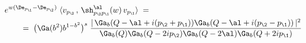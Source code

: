 \begin{equation}\label{g-matel}
\begin{aligned}
{} & e^{w(\De_{p_\1}-\De_{p_\2})}\;
\langle  v_{p_\2}\, ,\, \sh_{p_\2p_\1}^{\al}(w)\,
v_{p_\1} \rangle\;=\;\\
& \qquad =\;  \big(\Ga(b^2)b^{1-b^2}\big)^s\;
\frac{|\, \Ga_b(Q-\al+i(p_\2+p_\1))
\Ga_b(Q-\al+i(p_\2-p_\1))\,|^2}{\Ga_b(Q)
\Ga_b(Q-2ip_\2)\Ga_b(Q-2\al)\Ga_b(Q+2ip_\1)}
\end{aligned}
\end{equation}


